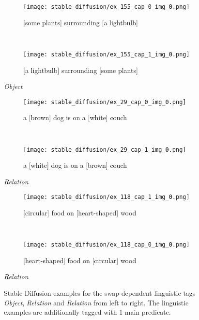 \begin{figure}
\centering
    \begin{minipage}[t]{.30\textwidth}
        \begin{subfigure}[t]{\textwidth}
        \centering
        \texttt{[image: stable\_diffusion/ex\_155\_cap\_0\_img\_0.png]}
        \caption{[some plants] surrounding [a lightbulb]}
        \end{subfigure}\\
        \begin{subfigure}[t]{\textwidth}
        \centering
        \texttt{[image: stable\_diffusion/ex\_155\_cap\_1\_img\_0.png]}
        \caption{[a lightbulb] surrounding [some plants]}
        \end{subfigure}%
        \caption*{\textit{Object}}
    \end{minipage}
    \hfill
    \begin{minipage}[t]{.30\textwidth}
        \begin{subfigure}[t]{\textwidth}
        \centering
        \texttt{[image: stable\_diffusion/ex\_29\_cap\_0\_img\_0.png]}
        \caption{a [brown] dog is on a [white] couch}
        \end{subfigure}\\
        \vspace{9pt}
        \begin{subfigure}[t]{\textwidth}
        \centering
        \texttt{[image: stable\_diffusion/ex\_29\_cap\_1\_img\_0.png]}
        \caption{a [white] dog is on a [brown] couch}
        \end{subfigure}%
        \caption*{\textit{Relation}}
    \end{minipage}
    \hfill
    \begin{minipage}[t]{.30\textwidth}
        \begin{subfigure}[t]{\textwidth}
        \centering
        \texttt{[image: stable\_diffusion/ex\_118\_cap\_1\_img\_0.png]}
        \caption{[circular] food on [heart-shaped] wood}
        \end{subfigure}\\
        \begin{subfigure}[t]{\textwidth}
        \centering
        \texttt{[image: stable\_diffusion/ex\_118\_cap\_0\_img\_0.png]}
        \caption{[heart-shaped] food on [circular] wood}
        \end{subfigure}%
        \caption*{\textit{Relation}}
    \end{minipage}%
    \caption{Stable Diffusion examples for the swap-dependent linguistic tags \textit{Object}, \textit{Relation} and \textit{Relation} from left to right. The linguistic examples are additionally tagged with 1 main predicate.}
    \label{fig:stable-diffusion-examples}
\end{figure}

